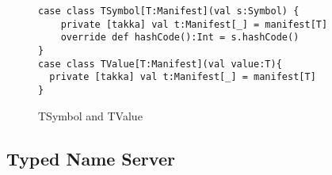 \begin{comment}
\subsection{Scala Type Descriptors}
Scala 2.8 defines a {\tt Manifest} class whose instance is a serializable 
first class type descriptor used at runtime.  With the help of 
the {\tt Manifest} class, users can record the type information, including 
generic types, which may be erased by the Java compiler.  

In the Scala interactive session below, we obtain a Manifest value at Line 5 and 
test a subtype relationship at Line 8.  To define a method that obtains type 
information of a generic type, Scala requires a type tag as an implicit 
argument to the method.  To simplify the API, Scala further provides a form of
syntactic sugar called context bounds.  We define a method using context
bounds at Line 11, which is compiled to the version using implicit 
arguments as shown at Line 12.


\begin{lstlisting}
scala> class Sup; class Sub extends Sup
defined class Sup
defined class Sub

scala> manifest[Sub]
res0: Manifest[Sub] = Sub

scala> manifest[Sub] <:< manifest[Sup]
res1: Boolean = true

scala> def getType[T:Manifest] = {manifest[T]}
getType: [T](implicit evidence$1: Manifest[T])Manifest[T]

scala> getType[Sub => Sup => Int]
res2: Manifest[Sub => (Sup => Int)] = scala.Function1[Sub, scala.Function1[Sup, Int]]

\end{lstlisting}

 
\end{comment}

\begin{figure}[!h]
\label{tsymbol}
\begin{lstlisting}
case class TSymbol[T:Manifest](val s:Symbol) {
    private [takka] val t:Manifest[_] = manifest[T]
    override def hashCode():Int = s.hashCode()  
}
case class TValue[T:Manifest](val value:T){
  private [takka] val t:Manifest[_] = manifest[T]
}
\end{lstlisting}
\caption{TSymbol and TValue}
\end{figure}

\subsection{Typed Name Server}
\label{nameserver}

